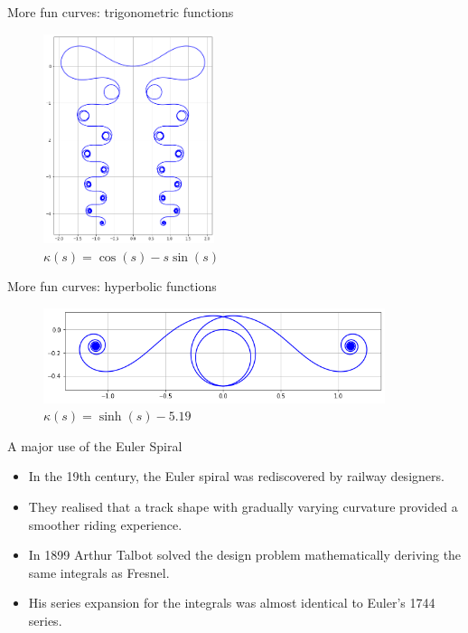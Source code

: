 \documentclass{beamer}
\begin{document}
\begin{frame}{More fun curves: trigonometric functions}
	\begin{figure}
		\caption{$\kappa(s) = \cos(s) - s \sin(s)$}
		\centering
		\includegraphics[width=50mm, scale=0.2]{elegant_madness.png}
	\end{figure}
\end{frame}
	
\begin{frame}{More fun curves: hyperbolic functions}
	\begin{figure}
		\caption{$\kappa(s) = \sinh(s) - 5.19$}
		\centering
		\includegraphics[width=100mm, scale=0.5]{sinh.png}
	\end{figure}
\end{frame}

\begin{frame}{A major use of the Euler Spiral}
	\begin{itemize}
		\item In the 19th century, the Euler spiral was rediscovered by railway designers.
		\item They realised that a track shape with gradually varying curvature provided a smoother riding experience.
		\item In 1899 Arthur Talbot solved the design problem mathematically deriving the same integrals as Fresnel.
		\item His series expansion for the integrals was almost identical to Euler's 1744 series. 
	\end{itemize}
\end{frame}
\end{document}
